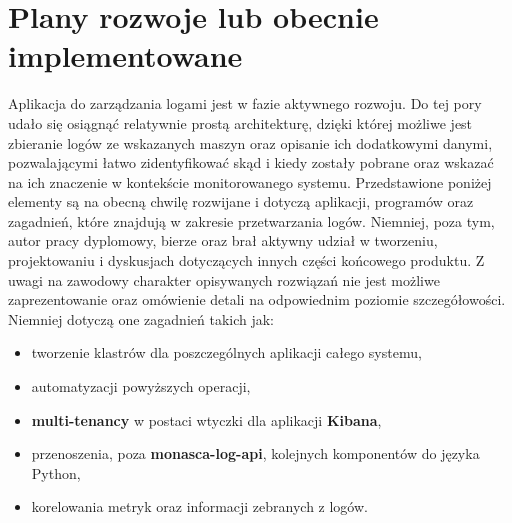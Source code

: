 \chapter{Plany rozwoje lub obecnie implementowane}
\label{chapter:application_own:plans}

Aplikacja do zarządzania logami jest w fazie aktywnego rozwoju. 
Do tej pory udało się osiągnąć relatywnie prostą architekturę, dzięki której
możliwe jest zbieranie logów ze wskazanych maszyn oraz opisanie ich
dodatkowymi danymi, pozwalającymi łatwo zidentyfikować skąd i kiedy
zostały pobrane oraz wskazać na ich znaczenie w kontekście monitorowanego systemu.
Przedstawione poniżej elementy są na obecną chwilę rozwijane i dotyczą aplikacji, programów
oraz zagadnień, które znajdują w zakresie przetwarzania logów. Niemniej, poza tym, autor
pracy dyplomowy, bierze oraz brał aktywny udział w tworzeniu, projektowaniu i dyskusjach
dotyczących innych części końcowego produktu. Z uwagi na zawodowy charakter opisywanych rozwiązań nie
jest możliwe zaprezentowanie oraz omówienie detali na odpowiednim poziomie szczegółowości. 
Niemniej dotyczą one zagadnień takich jak:
\begin{itemize}
    \item tworzenie klastrów dla poszczególnych aplikacji całego systemu,
    \item automatyzacji powyższych operacji,
    \item \textbf{multi-tenancy} w postaci wtyczki dla aplikacji \textbf{Kibana},
    \item przenoszenia, poza \textbf{monasca-log-api}, kolejnych komponentów do języka Python,
    \item korelowania metryk oraz informacji zebranych z logów.
\end{itemize}




